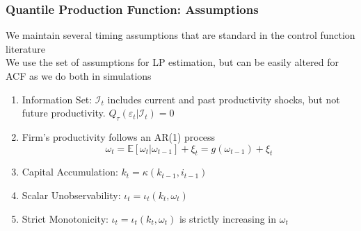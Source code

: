 \documentclass{beamer}
\begin{document}
\begin{frame}
\frametitle{Quantile Production Function: Assumptions}
We maintain several timing assumptions that are standard in the control function literature\\

We use the set of assumptions for LP estimation, but can be easily altered for ACF as we do both in simulations\\


\begin{enumerate}
	\item Information Set: $\mathcal{I}_{t}$ includes current and past productivity shocks, but not future productivity. $Q_{\tau}(\varepsilon_{t}|\mathcal{I}_{t})=0$
	\item Firm's productivity follows an AR(1) process
	\begin{equation}
		\omega_{t}=\mathbb{E}[\omega_{t}|\omega_{t-1}]+\xi_{t}=g(\omega_{t-1})+\xi_{t}
	\end{equation}
	\item Capital Accumulation: $k_{t}=\kappa(k_{t-1}, i_{t-1})$
	\item Scalar Unobservability: $\iota_{t}=\iota_{t}(k_{t}, \omega_{t})$
	\item Strict Monotonicity: $\iota_{t}=\iota_{t}(k_{t}, \omega_{t})$ is strictly increasing in $\omega_{t}$
\end{enumerate}
\end{frame}

\end{document}
